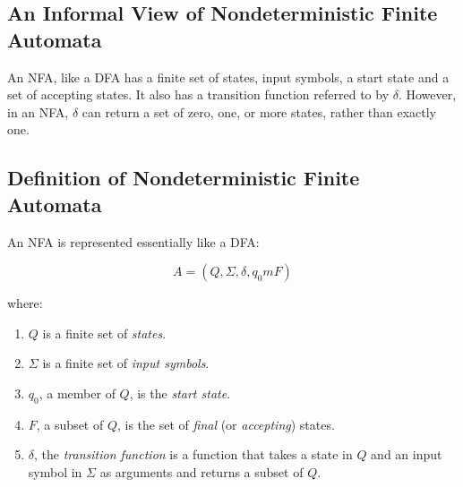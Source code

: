 \documentclass[]{article}
\begin{document}
  \subsection*{An Informal View of Nondeterministic Finite Automata}
    An NFA, like a DFA has a finite set of states, input symbols, a start 
    state and a set of accepting states. It also has a transition function 
    referred to by $\delta$. However, in an NFA, $\delta$ can return a set of 
    zero, one, or more states, rather than exactly one.
    
  \subsection*{Definition of Nondeterministic Finite Automata}
    An NFA is represented essentially like a DFA:
    
      \[ A = (Q, \Sigma, \delta, q_0m F) \]
      
    where:
      \begin{enumerate}
        \item $Q$ is a finite set of \emph{states}.
        \item $\Sigma$ is a finite set of \emph{input symbols}.
        \item $q_0$, a member of $Q$, is the \emph{start state}.
        \item $F$, a subset of $Q$, is the set of \emph{final} (or 
        \emph{accepting}) states.
        \item $\delta$, the \emph{transition function} is a function that 
        takes a state in $Q$ and an input symbol in $\Sigma$ as arguments and 
        returns a subset of $Q$.
      \end{enumerate}
    
\end{document}
